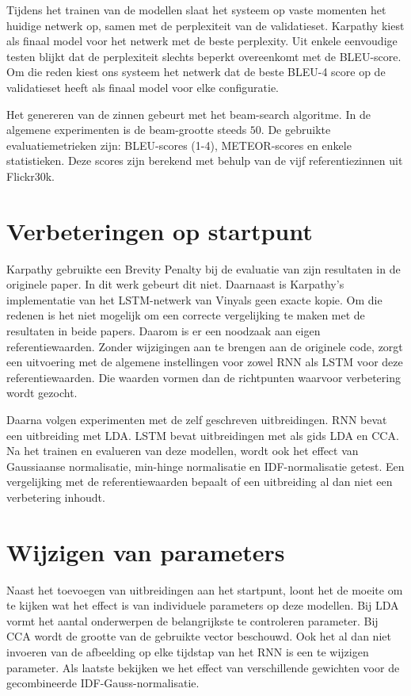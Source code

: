 Tijdens het trainen van de modellen slaat het systeem op vaste momenten het huidige netwerk op, samen met de perplexiteit van de validatieset. Karpathy kiest als finaal model voor het netwerk met de beste perplexity. Uit enkele eenvoudige testen blijkt dat de perplexiteit slechts beperkt overeenkomt met de BLEU-score. Om die reden kiest ons systeem het netwerk dat de beste BLEU-4 score op de validatieset heeft als finaal model voor elke configuratie.

Het genereren van de zinnen gebeurt met het beam-search algoritme. In de algemene experimenten is de beam-grootte steeds $50$.
De gebruikte evaluatiemetrieken zijn: BLEU-scores (1-4), METEOR-scores en enkele statistieken. Deze scores zijn berekend met behulp van de vijf referentiezinnen uit Flickr30k.

\section{Verbeteringen op startpunt}
Karpathy gebruikte een Brevity Penalty bij de evaluatie van zijn resultaten in de originele paper. In dit werk gebeurt dit niet. Daarnaast is Karpathy's implementatie van het LSTM-netwerk van Vinyals geen exacte kopie. Om die redenen is het niet mogelijk om een correcte vergelijking te maken met de resultaten in beide papers. Daarom is er een noodzaak aan eigen referentiewaarden. Zonder wijzigingen aan te brengen aan de originele code, zorgt een uitvoering met de algemene instellingen voor zowel RNN als LSTM voor deze referentiewaarden. Die waarden vormen dan de richtpunten waarvoor verbetering wordt gezocht.

Daarna volgen experimenten met de zelf geschreven uitbreidingen. RNN bevat een uitbreiding met LDA. LSTM bevat uitbreidingen met als gids LDA en CCA.
Na het trainen en evalueren van deze modellen, wordt ook het effect van Gaussiaanse normalisatie, min-hinge normalisatie en IDF-normalisatie getest.
Een vergelijking met de referentiewaarden bepaalt of een uitbreiding al dan niet een verbetering inhoudt.

\section{Wijzigen van parameters}
Naast het toevoegen van uitbreidingen aan het startpunt, loont het de moeite om te kijken wat het effect is van individuele parameters op deze modellen. Bij LDA vormt het aantal onderwerpen de belangrijkste te controleren parameter. Bij CCA wordt de grootte van de gebruikte vector beschouwd. Ook het al dan niet invoeren van de afbeelding op elke tijdstap van het RNN is een te wijzigen parameter. Als laatste bekijken we het effect van verschillende gewichten voor de gecombineerde IDF-Gauss-normalisatie.

